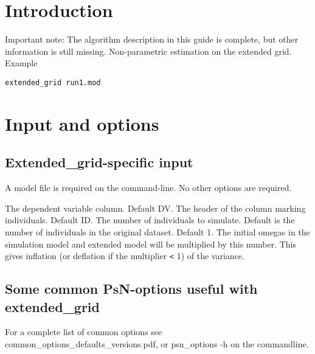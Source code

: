 



\maketitle


\section{Introduction}
Important note: The algorithm description in this guide is complete, but other information is still missing.
Non-parametric estimation on the extended grid. 
Example
\begin{verbatim}
extended_grid run1.mod
\end{verbatim}

\section{Input and options}

\subsection{Extended\_grid-specific input}

A model file is required on the command-line. No other options are required.

\begin{optionlist}
The dependent variable column. Default DV. 
\nextopt
{}
The header of the column marking individuals. Default ID. 
\nextopt
{}
The number of individuals to simulate. Default is the number of individuals in the original dataset. 
\nextopt
{}
Default 1. The initial omegas in the simulation model and extended model will be multiplied by this number. This gives inflation (or deflation if the multiplier \verb|<| 1) of the variance. 
\nextopt
\end{optionlist}


\subsection{Some common PsN-options useful with extended\_grid}

For a complete list of common options see common\_options\_defaults\_versions.pdf, or psn\_options -h on the commandline.

